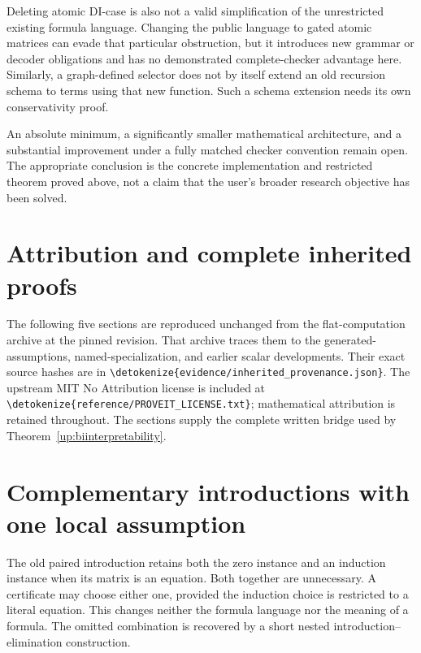 \documentclass[11pt,letterpaper]{article}
\theoremstyle{definition}\newtheorem{definition}[theorem]{Definition}
\theoremstyle{remark}\newtheorem{remark}[theorem]{Remark}
\newcommand{\file}[1]{\expandafter\nolinkurl\expandafter{\detokenize{#1}}}
\begin{document}
Deleting atomic DI-case is also not a valid simplification of the
unrestricted existing formula language. Changing the public language to
gated atomic matrices can evade that particular obstruction, but it
introduces new grammar or decoder obligations and has no demonstrated
complete-checker advantage here. Similarly, a graph-defined selector does
not by itself extend an old recursion schema to terms using that new
function. Such a schema extension needs its own conservativity proof.

An absolute minimum, a significantly smaller mathematical architecture,
and a substantial improvement under a fully matched checker convention
remain open. The appropriate conclusion is the concrete implementation
and restricted theorem proved above, not a claim that the user's broader
research objective has been solved.

\appendix
\clearpage
\section*{Attribution and complete inherited proofs}
The following five sections are reproduced unchanged from the
flat-computation archive at the pinned revision. That archive traces them
to the generated-assumptions, named-specialization, and earlier scalar
developments. Their exact source hashes are in
\file{evidence/inherited_provenance.json}. The upstream MIT No Attribution
license is included at \file{reference/PROVEIT_LICENSE.txt}; mathematical
attribution is retained throughout. The sections supply the complete
written bridge used by Theorem~\ref{up:biinterpretability}.



\section{Complementary introductions with one local assumption}
\label{sec:choice-introduction}

The old paired introduction retains both the zero instance and an
induction instance when its matrix is an equation. Both together are
unnecessary. A certificate may choose either one, provided the induction
choice is restricted to a literal equation. This changes neither the
formula language nor the meaning of a formula. The omitted combination
is recovered by a short nested introduction--elimination construction.
\end{document}
